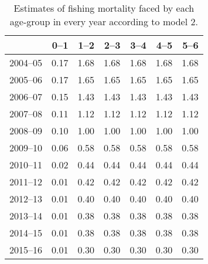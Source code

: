 \begin{table}[ht]
\centering
\begin{tabular}{rrrrrrr}
  \hline
 & 0--1 & 1--2 & 2--3 & 3--4 & 4--5 & 5--6 \\ 
  \hline
2004--05 & 0.17 & 1.68 & 1.68 & 1.68 & 1.68 & 1.68 \\ 
  2005--06 & 0.17 & 1.65 & 1.65 & 1.65 & 1.65 & 1.65 \\ 
  2006--07 & 0.15 & 1.43 & 1.43 & 1.43 & 1.43 & 1.43 \\ 
  2007--08 & 0.11 & 1.12 & 1.12 & 1.12 & 1.12 & 1.12 \\ 
  2008--09 & 0.10 & 1.00 & 1.00 & 1.00 & 1.00 & 1.00 \\ 
  2009--10 & 0.06 & 0.58 & 0.58 & 0.58 & 0.58 & 0.58 \\ 
  2010--11 & 0.02 & 0.44 & 0.44 & 0.44 & 0.44 & 0.44 \\ 
  2011--12 & 0.01 & 0.42 & 0.42 & 0.42 & 0.42 & 0.42 \\ 
  2012--13 & 0.01 & 0.40 & 0.40 & 0.40 & 0.40 & 0.40 \\ 
  2013--14 & 0.01 & 0.38 & 0.38 & 0.38 & 0.38 & 0.38 \\ 
  2014--15 & 0.01 & 0.38 & 0.38 & 0.38 & 0.38 & 0.38 \\ 
  2015--16 & 0.01 & 0.30 & 0.30 & 0.30 & 0.30 & 0.30 \\ 
   \hline
\end{tabular}
\caption{Estimates of fishing mortality faced by each age-group in every year according to model 2.} 
\label{tab:Mod2-FishingMortality}
\end{table}
